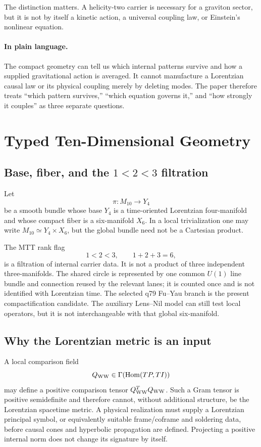 \documentclass[11pt,a4paper]{article}
\theoremstyle{definition}
\theoremstyle{remark}
\begin{document}
The distinction matters.  A helicity-two carrier is necessary for a graviton
sector, but it is not by itself a kinetic action, a universal coupling law, or
Einstein's nonlinear equation.

\paragraph{In plain language.}
The compact geometry can tell us which internal patterns survive and how a
supplied gravitational action is averaged.  It cannot manufacture a
Lorentzian causal law or its physical coupling merely by deleting modes.  The
paper therefore treats ``which pattern survives,'' ``which equation governs
it,'' and ``how strongly it couples'' as three separate questions.

\section{Typed Ten-Dimensional Geometry}

\subsection{Base, fiber, and the
\texorpdfstring{\(1<2<3\)}{1<2<3} filtration}

Let
\[
 \pi:M_{10}\longrightarrow Y_4
\]
be a smooth bundle whose base \(Y_4\) is a time-oriented Lorentzian
four-manifold and whose compact fiber is a six-manifold \(X_6\).  In a local
trivialization one may write \(M_{10}\simeq Y_4\times X_6\), but the global
bundle need not be a Cartesian product.

The MTT rank flag
\[
 1<2<3,\qquad 1+2+3=6,
\]
is a filtration of internal carrier data.  It is not a product of three
independent three-manifolds.  The shared circle is represented by one common
\(U(1)\) line bundle and connection reused by the relevant lanes; it is
counted once and is not identified with Lorentzian time.  The selected q79
Fu--Yau branch is the present compactification candidate.  The auxiliary
Lens--Nil model can still test local operators, but it is not interchangeable
with that global six-manifold.

\subsection{Why the Lorentzian metric is an input}

A local comparison field
\[
 Q_{\rm WW}\in\Gamma\!\left(\operatorname{Hom}(TP,TI)\right)
\]
may define a positive comparison tensor \(Q_{\rm WW}^{T}Q_{\rm WW}\).  Such a
Gram tensor is positive semidefinite and therefore cannot, without additional
structure, be the Lorentzian spacetime metric.  A physical realization must
supply a Lorentzian principal symbol, or equivalently suitable frame/coframe
and soldering data, before causal cones and hyperbolic propagation are
defined.  Projecting a positive internal norm does not change its signature
by itself.
\end{document}
